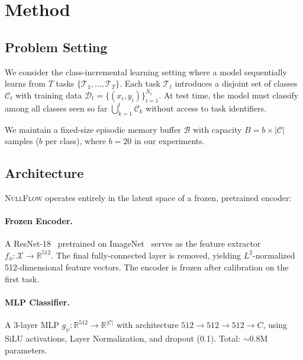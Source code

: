 \documentclass[10pt,twocolumn,letterpaper]{article}
\newcommand{\ours}{\textsc{NullFlow}}
\begin{document}
\section{Method}
\label{sec:method}

\subsection{Problem Setting}
\label{sec:setting}

We consider the class-incremental learning setting where a model sequentially learns from $T$ tasks $\{\mathcal{T}_1, \dots, \mathcal{T}_T\}$. Each task $\mathcal{T}_t$ introduces a disjoint set of classes $\mathcal{C}_t$ with training data $\mathcal{D}_t = \{(x_i, y_i)\}_{i=1}^{N_t}$. At test time, the model must classify among all classes seen so far $\bigcup_{k=1}^{t}\mathcal{C}_k$ without access to task identifiers.

We maintain a fixed-size episodic memory buffer $\mathcal{B}$ with capacity $B = b \times |\mathcal{C}|$ samples ($b$ per class), where $b=20$ in our experiments.

\subsection{Architecture}
\label{sec:architecture}

\ours{} operates entirely in the latent space of a frozen, pretrained encoder:

\paragraph{Frozen Encoder.} A ResNet-18~\cite{he2016deep} pretrained on ImageNet~\cite{deng2009imagenet} serves as the feature extractor $f_\phi: \mathcal{X} \to \mathbb{R}^{512}$. The final fully-connected layer is removed, yielding $L^2$-normalized 512-dimensional feature vectors. The encoder is frozen after calibration on the first task.

\paragraph{MLP Classifier.} A 3-layer MLP $g_\psi: \mathbb{R}^{512} \to \mathbb{R}^{|\mathcal{C}|}$ with architecture $512 \to 512 \to 512 \to C$, using SiLU activations, Layer Normalization, and dropout (0.1). Total: $\sim$0.8M parameters.
\end{document}
